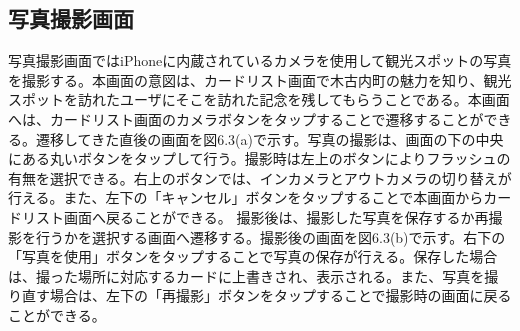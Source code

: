\subsection{写真撮影画面}
写真撮影画面ではiPhoneに内蔵されているカメラを使用して観光スポットの写真を撮影する。本画面の意図は、カードリスト画面で木古内町の魅力を知り、観光スポットを訪れたユーザにそこを訪れた記念を残してもらうことである。本画面へは、カードリスト画面のカメラボタンをタップすることで遷移することができる。遷移してきた直後の画面を図6.3(a)で示す。写真の撮影は、画面の下の中央にある丸いボタンをタップして行う。撮影時は左上のボタンによりフラッシュの有無を選択できる。右上のボタンでは、インカメラとアウトカメラの切り替えが行える。また、左下の「キャンセル」ボタンをタップすることで本画面からカードリスト画面へ戻ることができる。
撮影後は、撮影した写真を保存するか再撮影を行うかを選択する画面へ遷移する。撮影後の画面を図6.3(b)で示す。右下の「写真を使用」ボタンをタップすることで写真の保存が行える。保存した場合は、撮った場所に対応するカードに上書きされ、表示される。また、写真を撮り直す場合は、左下の「再撮影」ボタンをタップすることで撮影時の画面に戻ることができる。
\newpage

